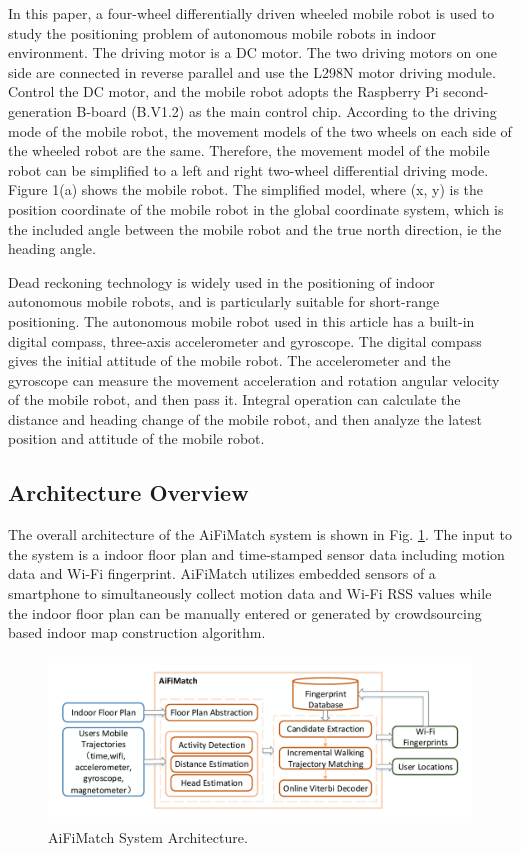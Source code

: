 \documentclass{llncs}
\begin{document}
In this paper, a four-wheel differentially driven wheeled mobile robot is used to study the positioning problem of autonomous mobile robots in indoor environment. The driving motor is a DC motor. The two driving motors on one side are connected in reverse parallel and use the L298N motor driving module. Control the DC motor, and the mobile robot adopts the Raspberry Pi second-generation B-board (B.V1.2) as the main control chip. According to the driving mode of the mobile robot, the movement models of the two wheels on each side of the wheeled robot are the same. Therefore, the movement model of the mobile robot can be simplified to a left and right two-wheel differential driving mode. Figure 1(a) shows the mobile robot. The simplified model, where (x, y) is the position coordinate of the mobile robot in the global coordinate system, which is the included angle between the mobile robot and the true north direction, ie the heading angle.

Dead reckoning technology is widely used in the positioning of indoor autonomous mobile robots, and is particularly suitable for short-range positioning. The autonomous mobile robot used in this article has a built-in digital compass, three-axis accelerometer and gyroscope. The digital compass gives the initial attitude of the mobile robot. The accelerometer and the gyroscope can measure the movement acceleration and rotation angular velocity of the mobile robot, and then pass it. Integral operation can calculate the distance and heading change of the mobile robot, and then analyze the latest position and attitude of the mobile robot.

\subsection{Architecture Overview}

The overall architecture of the AiFiMatch system is shown in Fig. \ref{fig-architecture}. The input to the system is a indoor floor plan and time-stamped sensor data including motion data and Wi-Fi fingerprint. AiFiMatch utilizes embedded sensors of a smartphone to simultaneously collect motion data and Wi-Fi RSS values while the indoor floor plan can be manually entered or generated by crowdsourcing based indoor map construction algorithm.

\vspace{-10pt}
\begin{figure}[!htbp]
	\centering
	\includegraphics[width=4.7in]{AiFiMatch-Architecture}
	\caption{AiFiMatch System Architecture.}
	\label{fig-architecture}
\end{figure}
\vspace{-10pt}
\end{document}
